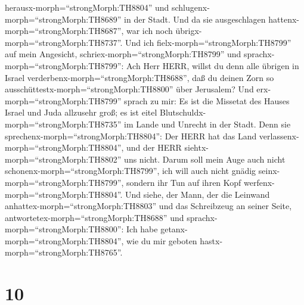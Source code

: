 herausx-morph=``strongMorph:TH8804'' und
schlugenx-morph=``strongMorph:TH8689'' in der Stadt.  Und da
sie ausgeschlagen hattenx-morph=``strongMorph:TH8687'', war ich noch
übrigx-morph=``strongMorph:TH8737''. Und ich
fielx-morph=``strongMorph:TH8799'' auf mein Angesicht,
schriex-morph=``strongMorph:TH8799'' und
sprachx-morph=``strongMorph:TH8799'': Ach Herr HERR, willst du denn alle
übrigen in Israel verderbenx-morph=``strongMorph:TH8688'', daß du deinen
Zorn so ausschüttestx-morph=``strongMorph:TH8800'' über Jerusalem?
 Und erx-morph=``strongMorph:TH8799'' sprach zu mir: Es ist
die Missetat des Hauses Israel und Juda allzusehr groß; es ist eitel
Blutschuldx-morph=``strongMorph:TH8735'' im Lande und Unrecht in der
Stadt. Denn sie sprechenx-morph=``strongMorph:TH8804'': Der HERR hat das
Land verlassenx-morph=``strongMorph:TH8804'', und der HERR
siehtx-morph=``strongMorph:TH8802'' uns nicht.  Darum soll
mein Auge auch nicht schonenx-morph=``strongMorph:TH8799'', ich will
auch nicht gnädig seinx-morph=``strongMorph:TH8799'', sondern ihr Tun
auf ihren Kopf werfenx-morph=``strongMorph:TH8804''.  Und
siehe, der Mann, der die Leinwand anhattex-morph=``strongMorph:TH8803''
und das Schreibzeug an seiner Seite,
antwortetex-morph=``strongMorph:TH8688'' und
sprachx-morph=``strongMorph:TH8800'': Ich habe
getanx-morph=``strongMorph:TH8804'', wie du mir geboten
hastx-morph=``strongMorph:TH8765''.

\hypertarget{section-9}{%
\section{10}\label{section-9}}

